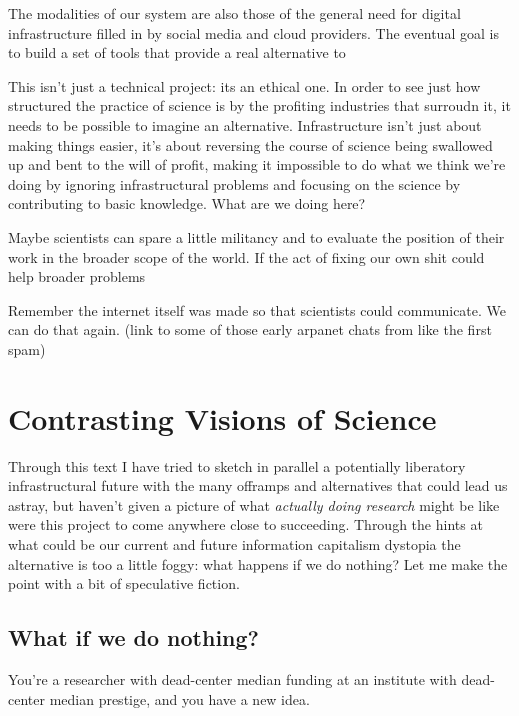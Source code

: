 The modalities of our system are also those of the general need for
digital infrastructure filled in by social media and cloud providers.
The eventual goal is to build a set of tools that provide a real
alternative to

This isn't just a technical project: its an ethical one. In order to see
just how structured the practice of science is by the profiting
industries that surroudn it, it needs to be possible to imagine an
alternative. Infrastructure isn't just about making things easier, it's
about reversing the course of science being swallowed up and bent to the
will of profit, making it impossible to do what we think we're doing by
ignoring infrastructural problems and focusing on the science by
contributing to basic knowledge. What are we doing here?

Maybe scientists can spare a little militancy and to evaluate the
position of their work in the broader scope of the world. If the act of
fixing our own shit could help broader problems

Remember the internet itself was made so that scientists could
communicate. We can do that again. (link to some of those early arpanet
chats from like the first spam)

\hypertarget{contrasting-visions-of-science}{%
\section{Contrasting Visions of
Science}\label{contrasting-visions-of-science}}

Through this text I have tried to sketch in parallel a potentially
liberatory infrastructural future with the many offramps and
alternatives that could lead us astray, but haven't given a picture of
what \emph{actually doing research} might be like were this project to
come anywhere close to succeeding. Through the hints at what could be
our current and future information capitalism dystopia the alternative
is too a little foggy: what happens if we do nothing? Let me make the
point with a bit of speculative fiction.

\hypertarget{what-if-we-do-nothing}{%
\subsection{What if we do nothing?}\label{what-if-we-do-nothing}}

You're a researcher with dead-center median funding at an institute with
dead-center median prestige, and you have a new idea.

